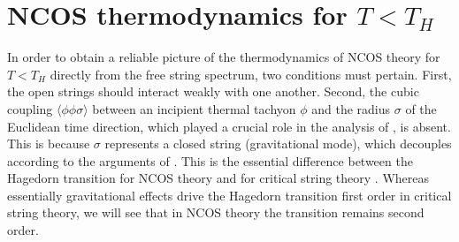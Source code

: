 \section{NCOS thermodynamics for $T<T_H$}
\label{LowT}

In order to obtain a reliable picture of the thermodynamics of NCOS
theory for $T<T_H$ directly from the free string spectrum, two
conditions must pertain.  First, the open strings should interact
weakly with one another.  Second, the cubic coupling
$\langle\phi\phi\sigma\rangle$ between an incipient thermal tachyon
$\phi$ and the radius $\sigma$ of the Euclidean time direction,
which played a crucial role in the analysis of \cite{AW}, is
absent. This is because $\sigma$ represents a closed string
(gravitational mode), which decouples according to the arguments of
\cite{SST,GMMS}.  This is the essential difference between
the Hagedorn transition for NCOS theory and for critical string theory
\cite{AW}.  Whereas essentially gravitational effects drive the
Hagedorn transition first order in critical string theory, we will see
that in NCOS theory the transition remains second order.

